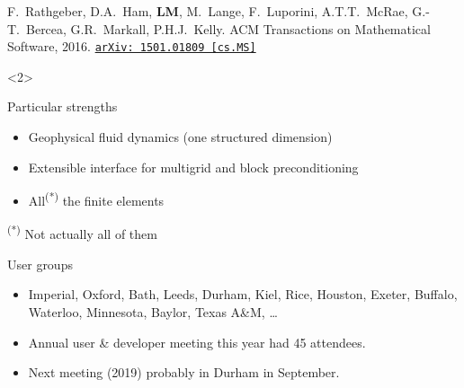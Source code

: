 \documentclass[presentation, 10pt]{beamer}
\newcommand{\arxivlink}[2]{%
  \href{https://www.arxiv.org/abs/#1}%
  {\texttt{arXiv:\,#1\,[#2]}}%
}
\begin{document}
\begin{frame}[t]
\begin{overlayarea}{\textwidth}{\textheight}
\begin{onlyenv}
    \begin{flushright}
      {\scriptsize F.~Rathgeber, D.A.~Ham, \textbf{LM}, M.~Lange,
        F.~Luporini, A.T.T.~McRae, G.-T.~Bercea, G.R.~Markall,
        P.H.J.~Kelly. ACM Transactions on Mathematical Software,
        2016. \arxivlink{1501.01809}{cs.MS}\nocite{Rathgeber:2016}}
    \end{flushright}
  \end{onlyenv}
  \begin{onlyenv}<2>
    \begin{block}{Particular strengths}
      \begin{itemize}
      \item Geophysical fluid dynamics (one structured dimension)
        
      \item Extensible interface for multigrid and block
        preconditioning
      \item All\textsuperscript{(*)} the finite elements
      \end{itemize}

      \textsuperscript{(*)} Not actually all of them
    \end{block}
    \begin{block}{User groups}
      \begin{itemize}
      \item Imperial, Oxford, Bath, Leeds, Durham, Kiel, Rice,
        Houston, Exeter, Buffalo, Waterloo, Minnesota, Baylor, Texas
        A\&M, \dots
      \item Annual user \& developer meeting this year had 45
        attendees.
      \item Next meeting (2019) probably in Durham in September.
      \end{itemize}
    \end{block}
  \end{onlyenv}
\end{overlayarea}
\end{frame}
\end{document}
